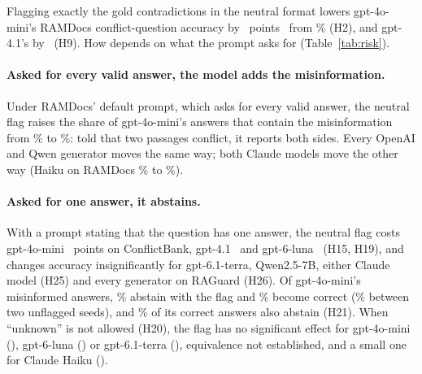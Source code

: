 Flagging exactly the gold contradictions in the neutral format lowers gpt-4o-mini's RAMDocs conflict-question accuracy
by \adOracleFlagConf\ points \dOracleFlagConfCI\ from \plainConf\% (H2), and gpt-4.1's by \agptOracleFlagConf\ (H9).
How depends on what the prompt asks for (Table~\ref{tab:risk}).

\paragraph{Asked for every valid answer, the model adds the misinformation.} Under RAMDocs' default prompt, which asks
for every valid answer, the neutral flag raises the share of gpt-4o-mini's
answers that contain the misinformation from \zmRdMiniPlainWrong\% to \zmRdMiniOracleFlagWrong\%: told that two
passages conflict, it reports both sides. Every OpenAI and Qwen generator moves the same way; both Claude models move
the other way (Haiku on RAMDocs \zmRdHaikuPlainWrong\% to \zmRdHaikuOracleFlagWrong\%).

\paragraph{Asked for one answer, it abstains.} With a prompt stating that the question has one answer, the neutral
flag costs gpt-4o-mini \azSgMiniOracleFlagConflict\ points on ConflictBank, gpt-4.1 \azSgFourOracleFlagConflict\ and
gpt-6-luna \azSgLunaOracleFlagConflict\ (H15, H19), and changes accuracy insignificantly for gpt-6.1-terra,
Qwen2.5-7B, either Claude model (H25) and every generator on RAGuard (H26). Of gpt-4o-mini's misinformed answers, \trSgMiniNeutralMisinfoAbstain\% abstain with the flag and
\trSgMiniNeutralMisinfoCorrect\% become correct (\trNullSgMiniMisinfoCorrect\% between two unflagged seeds), and
\trSgMiniNeutralCorrectAbstain\% of its correct answers also abstain (H21). When ``unknown'' is not allowed (H20), the flag has no
significant effect for gpt-4o-mini (\hTwentyFcMiniFlag), gpt-6-luna (\hTwentyFcLunaFlag) or gpt-6.1-terra
(\hTwentyFcTerraFlag), equivalence not established, and a small one for Claude Haiku (\hTwentyFcHaikuFlag).

